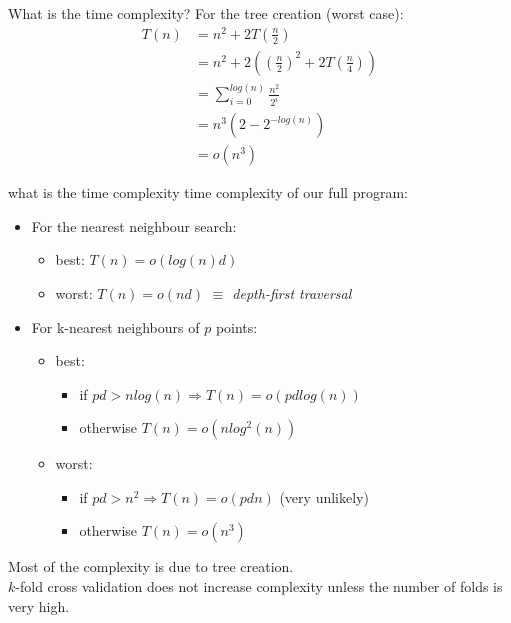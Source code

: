 \documentclass[11 pt]{beamer}
\begin{document}
\begin{frame}{What is the time complexity?}
  For the tree creation (worst case):
  \begin{align*}
    T(n) &= n^2 +2T\left(\frac{n}{2}\right)\\
         &= n^2 +2\left(\left(\frac{n}{2}\right)^2+2T\left(\frac{n}{4}\right)\right)\\
         &= \sum^{log(n)}_{i=0}\frac{n^2}{2^i}\\
         &= n^3(2-2^{-log(n)})\\
         &= o(n^3)
  \end{align*}
\end{frame}
%
\begin{frame}{what is the time complexity}
  time complexity of our full program:
  \smallskip
  \begin{itemize}
  \item For the nearest neighbour search:
  \begin{itemize}
    \item best: $T(n)=o(log(n)d)$
    \item worst: $T(n)=o(nd)$ \emph{$\equiv$ depth-first traversal}
  \end{itemize}
  \item For k-nearest neighbours of $p$ points:
  \begin{itemize}
    \item best:
    \begin{itemize}
      \item if $pd>nlog(n) \Rightarrow T(n) = o(pdlog(n))$
      \item otherwise $T(n) = o(nlog^2(n))$
    \end{itemize}
    \item worst:
    \begin{itemize}
      \item if $pd>n^2 \Rightarrow T(n)=o(pdn)$ (very unlikely)
      \item otherwise $T(n)=o(n^3)$
    \end{itemize}
  \end{itemize}
\end{itemize}
\smallskip
Most of the complexity is due to tree creation.\\\smallskip
$k$-fold cross validation does not increase complexity unless the number of folds is very high.
\end{frame}
%
\end{document}
